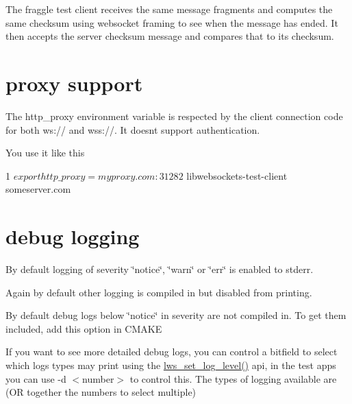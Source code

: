 The fraggle test client receives the same message fragments and computes the same checksum using websocket framing to see when the message has ended. It then accepts the server checksum message and compares that to its checksum.\hypertarget{md_README.test-apps_taproxy}{}\section{proxy support}\label{md_README.test-apps_taproxy}
The http\+\_\+proxy environment variable is respected by the client connection code for both {\ttfamily ws\+://} and {\ttfamily wss\+://}. It doesn\textquotesingle{}t support authentication.

You use it like this 
\begin{DoxyCode}
1 $ export http\_proxy=myproxy.com:3128
2 $ libwebsockets-test-client someserver.com
\end{DoxyCode}
\hypertarget{md_README.test-apps_talog}{}\section{debug logging}\label{md_README.test-apps_talog}
By default logging of severity \char`\"{}notice\char`\"{}, \char`\"{}warn\char`\"{} or \char`\"{}err\char`\"{} is enabled to stderr.

Again by default other logging is compiled in but disabled from printing.

By default debug logs below \char`\"{}notice\char`\"{} in severity are not compiled in. To get them included, add this option in C\+M\+A\+KE




If you want to see more detailed debug logs, you can control a bitfield to select which logs types may print using the {\ttfamily \hyperlink{group__log_ga244647f9e1bf0097ccdde66d74f41e26}{lws\+\_\+set\+\_\+log\+\_\+level()}} api, in the test apps you can use {\ttfamily -\/d $<$number$>$} to control this. The types of logging available are (OR together the numbers to select multiple)


